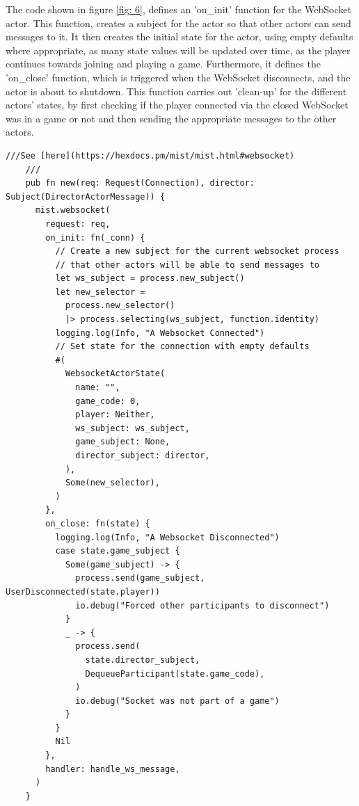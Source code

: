 \documentclass[]{final}
\begin{document}
\newpage

\noindent
\begin{minipage}[t]{17em}
  The code shown in figure \ref{fig: 6}, defines an 'on\_init' function for the WebSocket actor. This function,
  creates a subject for the actor so that other actors can send messages to it.
  It then creates the initial state for the actor, using empty defaults where appropriate,
  as many state values will be updated over time, as the player continues towards
  joining and playing a game. Furthermore, it defines the 'on\_close' function,
  which is triggered when the WebSocket disconnects, and the actor is about to shutdown. This function carries out
  'clean-up' for the different actors' states, by first checking if the player
  connected via the closed WebSocket was in a game or not and then sending the
  appropriate messages to the other actors.
\end{minipage}
\hfill
\begin{minipage}[t]{20em}
  \begin{lstlisting}[language=gleam]
    ///See [here](https://hexdocs.pm/mist/mist.html#websocket)
    ///
    pub fn new(req: Request(Connection), director: Subject(DirectorActorMessage)) {
      mist.websocket(
        request: req,
        on_init: fn(_conn) {
          // Create a new subject for the current websocket process
          // that other actors will be able to send messages to
          let ws_subject = process.new_subject()
          let new_selector =
            process.new_selector()
            |> process.selecting(ws_subject, function.identity)
          logging.log(Info, "A Websocket Connected")
          // Set state for the connection with empty defaults
          #(
            WebsocketActorState(
              name: "",
              game_code: 0,
              player: Neither,
              ws_subject: ws_subject,
              game_subject: None,
              director_subject: director,
            ),
            Some(new_selector),
          )
        },
        on_close: fn(state) {
          logging.log(Info, "A Websocket Disconnected")
          case state.game_subject {
            Some(game_subject) -> {
              process.send(game_subject, UserDisconnected(state.player))
              io.debug("Forced other participants to disconnect")
            }
            _ -> {
              process.send(
                state.director_subject,
                DequeueParticipant(state.game_code),
              )
              io.debug("Socket was not part of a game")
            }
          }
          Nil
        },
        handler: handle_ws_message,
      )
    }
  \end{lstlisting}
  \label{fig:6}
\end{minipage}
\end{document}
